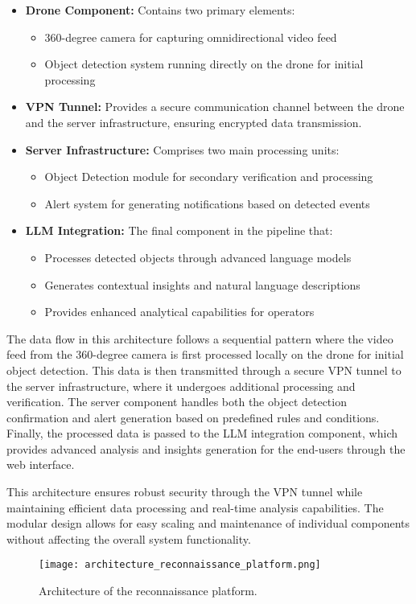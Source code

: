 \begin{itemize}
	\item \textbf{Drone Component:} Contains two primary elements:
	      \begin{itemize}
		      \item 360-degree camera for capturing omnidirectional video feed
		      \item Object detection system running directly on the drone for initial processing
	      \end{itemize}
	\item \textbf{VPN Tunnel:} Provides a secure communication channel between the drone and the server infrastructure, ensuring encrypted data transmission.
	\item \textbf{Server Infrastructure:} Comprises two main processing units:
	      \begin{itemize}
		      \item Object Detection module for secondary verification and processing
		      \item Alert system for generating notifications based on detected events
	      \end{itemize}
	\item \textbf{LLM Integration:} The final component in the pipeline that:
	      \begin{itemize}
		      \item Processes detected objects through advanced language models
		      \item Generates contextual insights and natural language descriptions
		      \item Provides enhanced analytical capabilities for operators
	      \end{itemize}
\end{itemize}

The data flow in this architecture follows a sequential pattern where the video feed from the 360-degree camera is first processed locally on the drone for initial object detection. This data is then transmitted through a secure VPN tunnel to the server infrastructure, where it undergoes additional processing and verification. The server component handles both the object detection confirmation and alert generation based on predefined rules and conditions. Finally, the processed data is passed to the LLM integration component, which provides advanced analysis and insights generation for the end-users through the web interface.

This architecture ensures robust security through the VPN tunnel while maintaining efficient data processing and real-time analysis capabilities. The modular design allows for easy scaling and maintenance of individual components without affecting the overall system functionality.

\begin{figure}
	\texttt{[image: architecture\_reconnaissance\_platform.png]}
	\caption{Architecture of the reconnaissance platform.} \label{fig:architecture_reconnaissance_platform}
\end{figure}

